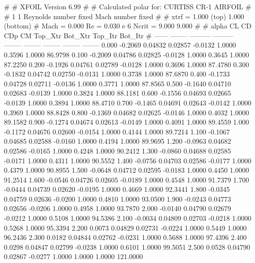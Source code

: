 #  
#       XFOIL         Version 6.99
#  
# Calculated polar for: CURTISS CR-1 AIRFOIL                            
#  
# 1 1 Reynolds number fixed          Mach number fixed         
#  
# xtrf =   1.000 (top)        1.000 (bottom)  
# Mach =   0.000     Re =     0.030 e 6     Ncrit =   9.000  9.000
#  
#   alpha    CL        CD       CDp       CM     Top_Xtr  Bot_Xtr  Top_Itr  Bot_Itr
#  ------ -------- --------- --------- -------- -------- -------- -------- --------
   0.000  -0.2069   0.04832   0.02857  -0.0132   1.0000   0.3596   1.0000  86.9798
   0.100  -0.2009   0.04786   0.02825  -0.0128   1.0000   0.3645   1.0000  87.2250
   0.200  -0.1926   0.04761   0.02789  -0.0128   1.0000   0.3696   1.0000  87.4780
   0.300  -0.1832   0.04742   0.02750  -0.0131   1.0000   0.3738   1.0000  87.6870
   0.400  -0.1733   0.04728   0.02711  -0.0136   1.0000   0.3771   1.0000  87.8565
   0.500  -0.1640   0.04710   0.02683  -0.0139   1.0000   0.3824   1.0000  88.1181
   0.600  -0.1556   0.04693   0.02665  -0.0139   1.0000   0.3894   1.0000  88.4710
   0.700  -0.1465   0.04691   0.02643  -0.0142   1.0000   0.3969   1.0000  88.8428
   0.800  -0.1369   0.04682   0.02625  -0.0146   1.0000   0.4032   1.0000  89.1582
   0.900  -0.1274   0.04674   0.02613  -0.0149   1.0000   0.4091   1.0000  89.4559
   1.000  -0.1172   0.04676   0.02600  -0.0154   1.0000   0.4144   1.0000  89.7214
   1.100  -0.1067   0.04685   0.02588  -0.0160   1.0000   0.4194   1.0000  89.9695
   1.200  -0.0963   0.04682   0.02586  -0.0165   1.0000   0.4248   1.0000  90.2412
   1.300  -0.0860   0.04688   0.02585  -0.0171   1.0000   0.4311   1.0000  90.5552
   1.400  -0.0756   0.04703   0.02586  -0.0177   1.0000   0.4379   1.0000  90.8955
   1.500  -0.0648   0.04712   0.02595  -0.0183   1.0000   0.4450   1.0000  91.2514
   1.600  -0.0546   0.04726   0.02605  -0.0189   1.0000   0.4548   1.0000  91.7379
   1.700  -0.0444   0.04739   0.02620  -0.0195   1.0000   0.4669   1.0000  92.3441
   1.800  -0.0345   0.04759   0.02636  -0.0200   1.0000   0.4810   1.0000  93.0500
   1.900  -0.0243   0.04773   0.02656  -0.0206   1.0000   0.4958   1.0000  93.7870
   2.000  -0.0140   0.04790   0.02679  -0.0212   1.0000   0.5108   1.0000  94.5386
   2.100  -0.0034   0.04809   0.02703  -0.0218   1.0000   0.5268   1.0000  95.3394
   2.200   0.0073   0.04829   0.02731  -0.0224   1.0000   0.5449   1.0000  96.2436
   2.300   0.0182   0.04844   0.02762  -0.0231   1.0000   0.5688   1.0000  97.4396
   2.400   0.0298   0.04847   0.02799  -0.0238   1.0000   0.6101   1.0000  99.5051
   2.500   0.0528   0.04790   0.02867  -0.0277   1.0000   1.0000   1.0000 121.0000
